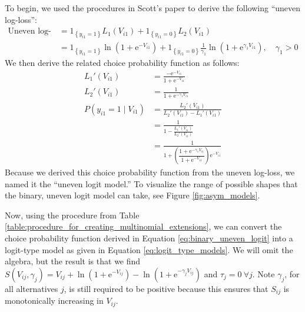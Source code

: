 To begin, we used the procedures in Scott's paper to derive the following ``uneven log-loss'':
\begin{equation}
\label{eq:uneven_log_loss}
\begin{aligned}
\textrm{Uneven log-loss} &= 1_{\left\lbrace y_{i1} = 1 \right\rbrace} L_1 \left( V_{i1} \right) + 1_{\left\lbrace y_{i1} = 0 \right\rbrace} L_2 \left( V_{i1} \right)\\
&= 1_{\left\lbrace y_{i1} = 1 \right\rbrace} \ln \left(1 + \mathrm{e}^{-V_{i1}} \right) + 1_{\left\lbrace y_{i1} = 0 \right\rbrace} \frac{1}{\gamma_1} \ln \left(1 + \mathrm{e}^{\gamma_1 V_{i1} } \right), \quad \gamma_1 >  0
\end{aligned}
\end{equation}
We then derive the related choice probability function as follows:
\begin{equation}
\label{eq:binary_uneven_logit}
\begin{aligned}
L_1 ' \left( V_{i1} \right) &= \frac{- \mathrm{e}^{ -V_{i1} } }{1 +\mathrm{e}^{ -V_{i1} } }
\\
L_2 ' \left( V_{i1} \right) &=  \frac{1 }{1 + \mathrm{e}^{ - \gamma_1 V_{i1}}}
\\
P \left( y_{i1} = 1 \mid V_{i1} \right) &=  \frac{ L_{2}' \left( V_{i1} \right) }{ L_{2}' \left( V_{i1} \right) - L_{1}' \left( V_{i1} \right) }
\\
&= \frac{1}{1 - \frac{ L_{1}' \left( V_{i1} \right) }{L_{2}' \left( V_{i1} \right) }}
\\
&= \frac{1}{1 + \left( \dfrac{ 1 + \mathrm{e}^{ - \gamma_1 V_{i1}} }{ 1 +\mathrm{e}^{ -V_{i1} } } \right)  \mathrm{e}^{ -V_{i1} } }
\end{aligned}
\end{equation}
Because we derived this choice probability function from the uneven log-loss, we named it the ``uneven logit model.'' To visualize the range of possible shapes that the binary, uneven logit model can take, see Figure \ref{fig:asym_models}.

Now, using the procedure from Table \ref{table:procedure_for_creating_multinomial_extensions}, we can convert the choice probability function derived in Equation \ref{eq:binary_uneven_logit} into a logit-type model as given in Equation \ref{eq:logit_type_models}. We will omit the algebra, but the result is that we find $S \left( V_{ij}, \gamma_j \right) = V_{ij} + \ln \left( 1 + \mathrm{e}^{- V_{ij}} \right) - \ln \left( 1 + \mathrm{e}^{- \gamma _j V_{ij}} \right)$ and $\tau_j = 0 \ \forall j$. Note $\gamma_j$, for all alternatives $j$, is still required to be positive because this ensures that $S_{ij}$ is monotonically increasing in $V_{ij}$.

